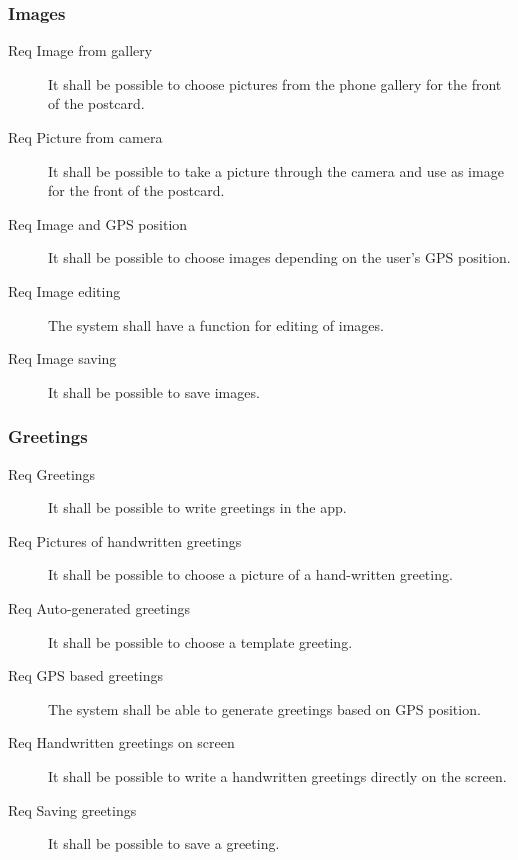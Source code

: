 \documentclass[10pt,a4paper]{article}
\begin{document}
\subsubsection{Images} 
\begin {description}
\item [Req  Image from gallery]It shall be possible to choose pictures from the phone gallery for the front of the postcard.
\item [Req  Picture from camera] It shall be possible to take a picture through the camera and use as image for the front of the postcard.
\item [Req  Image and GPS position] It shall be possible to choose images depending on the user's GPS position.
\item [Req  Image editing] The system shall have a function for editing of images.
\item [Req  Image saving] It shall be possible to save images.
\end{description}
\subsubsection{Greetings}
\begin{description}
\item [Req  Greetings] It shall be possible to write greetings in the app.
\item [Req  Pictures of handwritten greetings] It shall be possible to choose a picture of a hand-written greeting.
\item [Req  Auto-generated greetings] It shall be possible to choose a template greeting.
\item [Req  GPS based greetings] The system shall be able to generate greetings based on GPS position.
\item [Req  Handwritten greetings on screen] It shall be possible to write a handwritten greetings directly on the screen.
\item [Req  Saving greetings] It shall be possible to save a greeting.
\end{description}
\end{document}

